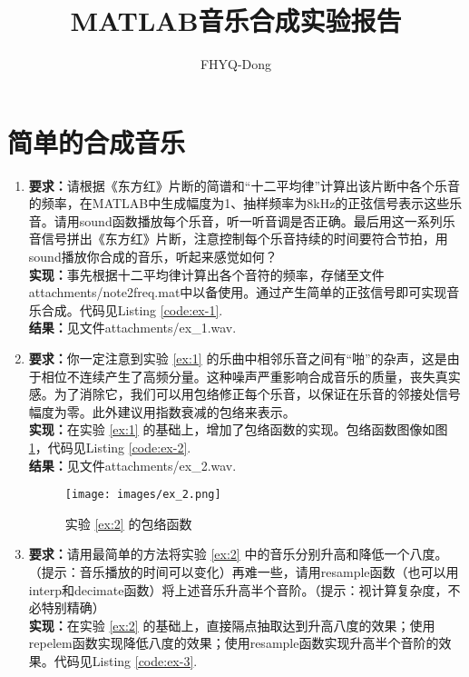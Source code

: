 \documentclass[utf8]{article}
\title{MATLAB音乐合成实验报告}
\author{FHYQ-Dong}
\date{\zhtoday}
\begin{document}
\maketitle
\thispagestyle{fancy}

\section{简单的合成音乐}
\begin{enumerate}
    \item \label{ex:1}\textbf{要求：}请根据《东方红》片断的简谱和``十二平均律''计算出该片断中各个乐音的频率，在MATLAB中生成幅度为1、抽样频率为8kHz的正弦信号表示这些乐音。请用sound函数播放每个乐音，听一听音调是否正确。最后用这一系列乐音信号拼出《东方红》片断，注意控制每个乐音持续的时间要符合节拍，用sound播放你合成的音乐，听起来感觉如何？ \\
        \textbf{实现：}事先根据十二平均律计算出各个音符的频率，存储至文件attachments/note2freq.mat中以备使用。通过产生简单的正弦信号即可实现音乐合成。代码见Listing \ref{code:ex-1}. \\
        \textbf{结果：}见文件attachments/ex\_1.wav.
    \item \label{ex:2}\textbf{要求：}你一定注意到实验 \ref{ex:1} 的乐曲中相邻乐音之间有``啪''的杂声，这是由于相位不连续产生了高频分量。这种噪声严重影响合成音乐的质量，丧失真实感。为了消除它，我们可以用包络修正每个乐音，以保证在乐音的邻接处信号幅度为零。此外建议用指数衰减的包络来表示。 \\
        \textbf{实现：}在实验 \ref{ex:1} 的基础上，增加了包络函数的实现。包络函数图像如图 \ref{fig:ex-2}，代码见Listing \ref{code:ex-2}. \\
        \textbf{结果：}见文件attachments/ex\_2.wav.
        \begin{figure}[H]
            \centering
            \texttt{[image: images/ex\_2.png]}
            \caption{实验 \ref{ex:2} 的包络函数}
            \label{fig:ex-2}
        \end{figure}
    \item \label{ex:3}\textbf{要求：}请用最简单的方法将实验 \ref{ex:2} 中的音乐分别升高和降低一个八度。（提示：音乐播放的时间可以变化）再难一些，请用resample函数（也可以用interp和decimate函数）将上述音乐升高半个音阶。（提示：视计算复杂度，不必特别精确） \\
        \textbf{实现：}在实验 \ref{ex:2} 的基础上，直接隔点抽取达到升高八度的效果；使用repelem函数实现降低八度的效果；使用resample函数实现升高半个音阶的效果。代码见Listing \ref{code:ex-3}. \\

\end{enumerate}
\end{document}
